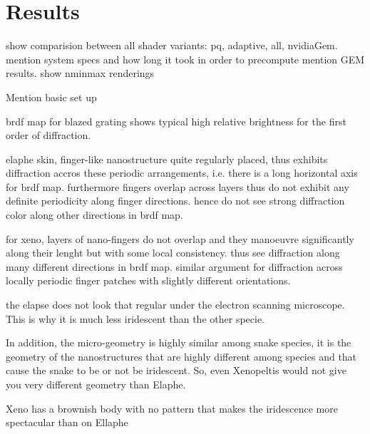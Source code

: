\chapter{Results}

show comparision between all shader variants: pq, adaptive, all, nvidiaGem.
mention system specs and how long it took in order to precompute
mention GEM results.
show nminmax renderings










Mention basic set up


brdf map for blazed grating shows typical high relative brightness for the first order of diffraction.

elaphe skin, finger-like nanostructure quite regularly placed, thus exhibits diffraction accros these periodic arrangements, i.e. there is a long horizontal axis for brdf map. furthermore fingers overlap across layers thus do not exhibit any definite periodicity along finger directions. hence do not see strong diffraction color along other directions in brdf map.

for xeno, layers of nano-fingers do not overlap and they manoeuvre significantly along their lenght but with some local consistency. thus see diffraction along many different directions in brdf map. similar argument for diffraction across locally periodic finger patches with slightly different orientations.


the elapse does not look that regular under the electron scanning microscope. This is why it is much less iridescent than the other specie.

In addition, the micro-geometry is highly similar among snake species, it is the geometry of the nanostructures that are highly different among species and that cause the snake to be or not be iridescent. So, even Xenopeltis would not give you very different geometry than Elaphe.

Xeno has a brownish body with no pattern that makes the iridescence more spectacular than on Ellaphe


